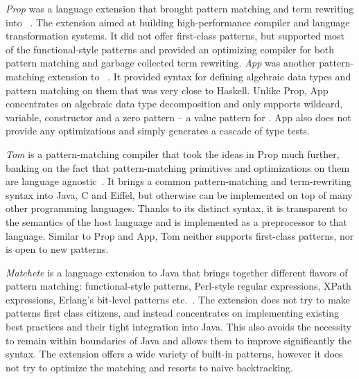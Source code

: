 \emph{Prop} was a language extension that brought pattern matching and term 
rewriting into \Cpp{}~\cite{Prop96}. The extension aimed at building 
high-performance compiler and language transformation systems. It did not offer 
first-class patterns, but supported most of the functional-style patterns and 
provided an optimizing compiler for both pattern matching and garbage collected 
term rewriting. \emph{App} was another pattern-matching extension to \Cpp{}~\cite{App}. 
It provided syntax for defining algebraic data types and pattern matching on 
them that was very close to Haskell. Unlike Prop, App concentrates on algebraic 
data type decomposition and only supports wildcard, variable, constructor and a 
zero pattern -- a value pattern for . App also does not provide 
any optimizations and simply generates a cascade of type tests.

\emph{Tom} is a pattern-matching compiler that took the ideas in Prop much 
further, banking on the fact that pattern-matching primitives and optimizations 
on them are language agnostic~\cite{Moreau:2003}. It brings a common 
pattern-matching and term-rewriting syntax into Java, C and Eiffel, but 
otherwise can be implemented on top of many other programming languages. Thanks 
to its distinct syntax, it is transparent to the semantics of the host language 
and is implemented as a preprocessor to that language. Similar to Prop and App, 
Tom neither supports first-class patterns, nor is open to new patterns. 

\emph{Matchete} is a language extension to Java that brings together different flavors 
of pattern matching: functional-style patterns, Perl-style regular expressions, 
XPath expressions, Erlang's bit-level patterns etc.~\cite{padl08}. The extension 
does not try to make patterns first class citizens, and instead concentrates on 
implementing existing best practices and their tight integration into Java. This 
also avoids the necessity to remain within boundaries of Java and allows them to 
improve significantly the syntax. The extension offers a wide variety of 
built-in patterns, however it does not try to optimize the matching and resorts 
to naive backtracking. 

